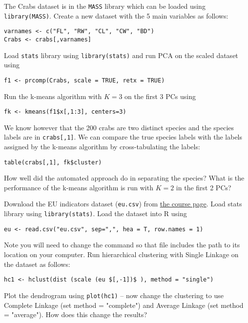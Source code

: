 \documentclass[answers]{exam}
\begin{document}
\begin{questions}
\question%
The Crabs dataset is in the \texttt{MASS} library which can be loaded using
\verb|library(MASS)|. Create a new dataset with the 5 main variables as follows: \begin{verbatim}
varnames <- c("FL", "RW", "CL", "CW", "BD")
Crabs <- crabs[,varnames]
\end{verbatim} Load \texttt{stats} library using \verb|library(stats)| and run PCA on the scaled dataset using \begin{verbatim}
f1 <- prcomp(Crabs, scale = TRUE, retx = TRUE)
\end{verbatim} Run the k-means algorithm with $K=3$ on the first 3 PCs using \begin{verbatim}
fk <- kmeans(f1$x[,1:3], centers=3)
\end{verbatim} We know however that the 200 crabs are two distinct species and the species labels are in \verb|crabs[,1]|. We can compare the true species labels with the labels assigned by the k-means algorithm by cross-tabulating the labels: \begin{verbatim}
table(crabs[,1], fk$cluster)
\end{verbatim} How well did the automated approach do in separating the species? What is the performance of the k-means algorithm is run with $K=2$ in the first 2 PCs?



\question%
Download the EU indicators dataset (\texttt{eu.csv}) from \href{https://courses.maths.ox.ac.uk/course/view.php?id=620}{the course page}. Load stats library using \verb|library(stats)|. Load the dataset into R using \begin{verbatim}
eu <- read.csv("eu.csv", sep=",", hea = T, row.names = 1)
\end{verbatim} Note you will need to change the command so that file includes the path to its location on your computer. Run hierarchical clustering with Single Linkage on the dataset as follows: \begin{verbatim}
hc1 <- hclust(dist (scale (eu $[,-1])$ ), method = "single")
\end{verbatim} Plot the dendrogram using \verb|plot(hc1)| -- now change the clustering to use Complete Linkage (set method = "complete") and Average Linkage (set method = "average"). How does this change the results?

\end{questions}
\end{document}
